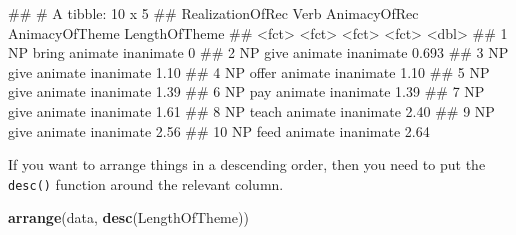 \documentclass[
]{book}
\newenvironment{Shaded}{\begin{snugshade}}{\end{snugshade}}
\newcommand{\FunctionTok}[1]{\textcolor[rgb]{0.13,0.29,0.53}{\textbf{#1}}}
\newcommand{\NormalTok}[1]{#1}
\begin{document}
\begin{Shaded}
\begin{Highlighting}[]
\NormalTok{\#\# \# A tibble: 10 x 5}
\NormalTok{\#\#    RealizationOfRec Verb  AnimacyOfRec AnimacyOfTheme LengthOfTheme}
\NormalTok{\#\#    \textless{}fct\textgreater{}            \textless{}fct\textgreater{} \textless{}fct\textgreater{}        \textless{}fct\textgreater{}                  \textless{}dbl\textgreater{}}
\NormalTok{\#\#  1 NP               bring animate      inanimate              0    }
\NormalTok{\#\#  2 NP               give  animate      inanimate              0.693}
\NormalTok{\#\#  3 NP               give  animate      inanimate              1.10 }
\NormalTok{\#\#  4 NP               offer animate      inanimate              1.10 }
\NormalTok{\#\#  5 NP               give  animate      inanimate              1.39 }
\NormalTok{\#\#  6 NP               pay   animate      inanimate              1.39 }
\NormalTok{\#\#  7 NP               give  animate      inanimate              1.61 }
\NormalTok{\#\#  8 NP               teach animate      inanimate              2.40 }
\NormalTok{\#\#  9 NP               give  animate      inanimate              2.56 }
\NormalTok{\#\# 10 NP               feed  animate      inanimate              2.64}
\end{Highlighting}
\end{Shaded}

If you want to arrange things in a descending order, then you need to put the \texttt{desc()} function around the relevant column.

\begin{Shaded}
\begin{Highlighting}[]
\FunctionTok{arrange}\NormalTok{(data, }\FunctionTok{desc}\NormalTok{(LengthOfTheme))}
\end{Highlighting}
\end{Shaded}
\end{document}
